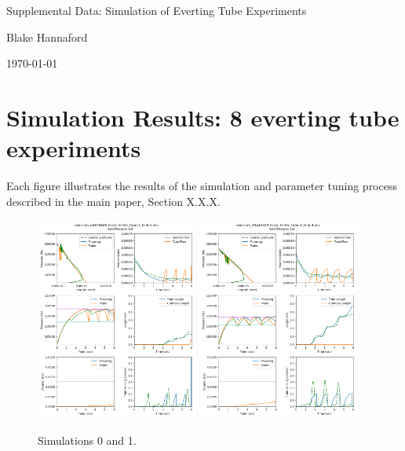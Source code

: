 \documentclass[letterpaper]{article}
\begin{document}
\begin{centering}
{\Large  Supplemental Data: Simulation of Everting Tube Experiments}

Blake Hannaford

\today

\end{centering}

\section{Simulation Results: 8 everting tube experiments}
Each figure illustrates the results of the simulation and parameter tuning process described in the main paper, Section X.X.X.
\vspace{0.5in}

\begin{figure}[h]\centering
\includegraphics[width=0.475\textwidth]{Set0result27-Jul.png}
\includegraphics[width=0.475\textwidth]{Set1result27-Jul.png}
\caption{Simulations 0 and 1.}
\end{figure}
\end{document}
